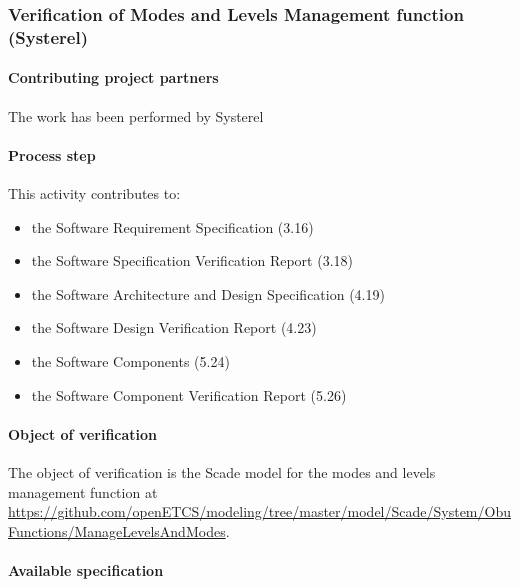 

\subsubsection{Verification of Modes and Levels Management function (Systerel) }
\label{sec:}

\paragraph{Contributing project partners}
The work has been performed by Systerel

\paragraph{Process step}


This activity contributes to:
\begin{itemize}
\item the Software Requirement Specification  (3.16)
\item the Software Specification Verification Report  (3.18)  
\item the Software Architecture and Design Specification (4.19)
\item the Software Design Verification Report  (4.23)  
\item the Software Components (5.24)
\item the Software Component Verification Report  (5.26)  
\end{itemize}



\paragraph{Object of verification}

The object of verification is the Scade model for the modes and levels management function at {\url{https://github.com/openETCS/modeling/tree/master/model/Scade/System/ObuFunctions/ManageLevelsAndModes}}. 


\paragraph{Available specification}

